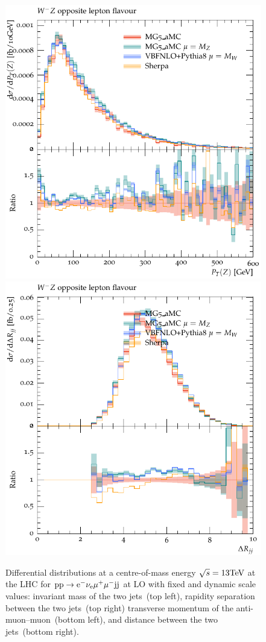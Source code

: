 \documentclass[11pt]{cernrep}
\begin{document}
\begin{figure}[htbp]
\begin{center}
   \includegraphics[scale=0.5]{figs/WmZ_OF_ZPt}
   \includegraphics[scale=0.5]{figs/WmZ_OF_dRjj}
\caption{Differential distributions at a centre-of-mass energy $\sqrt{s}=13{\rm TeV}$ at the LHC for ${\rm p} {\rm p}
  \to {\rm e}^-  \nu_{\rm e}  \mu^+ \mu^- {\rm j} {\rm j}$ at LO with fixed and dynamic scale values:  
                invariant mass of the two jets~(top left),
                rapidity separation between the two jets~(top right)
                transverse momentum of the anti-muon--muon~(bottom left), and
                distance between the two jets~(bottom right).}
\label{vbs_fig_shower_3a}
\end{center}
\end{figure}
\end{document}
